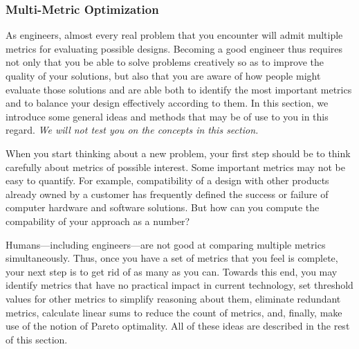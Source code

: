 \subsubsection{Multi-Metric Optimization}

As engineers, almost every real problem that you encounter will admit 
multiple metrics for evaluating possible designs.  Becoming a good
engineer thus requires not only that you be able to solve problems
creatively so as to improve the quality of your solutions, but also
that you are aware of how people might evaluate those solutions and
are able both to identify the most important metrics and to balance 
your design effectively according to them.  In this section, we
introduce some general ideas and methods that may be of use to you
in this regard.
%
{\em We will not test you on the concepts in this section.}

When you start thinking about a new problem, your first step
should be to think carefully about metrics of possible interest.
%
Some important metrics may not be easy to quantify.  
%
For example, compatibility of a design with other products already 
owned by a customer has frequently defined the success or failure
of computer hardware and software solutions.
%
But how can you compute the compability of your approach as
a number?

Humans---including engineers---are not good at
comparing multiple metrics simultaneously.
%
Thus, once you have a set of metrics that you feel is complete, 
your next step is to get rid of as many as you can.
%
Towards this end, you may identify metrics that have no practical 
impact in current technology, set threshold values for other metrics
to simplify reasoning about them, eliminate redundant metrics,
calculate linear sums to reduce the count of metrics, and, finally,
make use of the notion of Pareto optimality.  All of these ideas are
described in the rest of this section.

